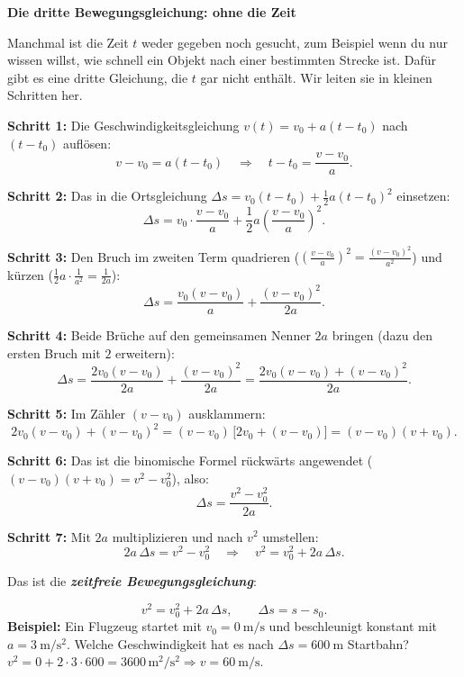 \documentclass[addpoints,11pt,a4paper]{exam}
\newenvironment{theoriebox}[1][Theorie]{%
  \par\addvspace{10pt}\noindent\textbf{#1}\par\smallskip\noindent
}{%
  \par\addvspace{10pt}
}
\begin{document}
\begin{theoriebox}[Die dritte Bewegungsgleichung: ohne die Zeit]
Manchmal ist die Zeit $t$ weder gegeben noch gesucht, zum Beispiel wenn
du nur wissen willst, wie schnell ein Objekt nach einer bestimmten
Strecke ist. Dafür gibt es eine dritte Gleichung, die $t$ gar nicht
enthält. Wir leiten sie in kleinen Schritten her.

\textbf{Schritt 1:} Die Geschwindigkeitsgleichung $v(t)=v_0+a(t-t_0)$
nach $(t-t_0)$ auflösen:
\[
  v - v_0 = a(t-t_0)
  \quad\Longrightarrow\quad
  t-t_0 = \frac{v-v_0}{a}.
\]

\textbf{Schritt 2:} Das in die Ortsgleichung
$\Delta s = v_0(t-t_0)+\frac{1}{2}a(t-t_0)^2$ einsetzen:
\[
  \Delta s = v_0\cdot\frac{v-v_0}{a} + \frac{1}{2}a\left(\frac{v-v_0}{a}\right)^2.
\]

\textbf{Schritt 3:} Den Bruch im zweiten Term quadrieren
($\left(\frac{v-v_0}{a}\right)^2 = \frac{(v-v_0)^2}{a^2}$) und kürzen
($\frac{1}{2}a\cdot\frac{1}{a^2}=\frac{1}{2a}$):
\[
  \Delta s = \frac{v_0(v-v_0)}{a} + \frac{(v-v_0)^2}{2a}.
\]

\textbf{Schritt 4:} Beide Brüche auf den gemeinsamen Nenner $2a$ bringen
(dazu den ersten Bruch mit $2$ erweitern):
\[
  \Delta s = \frac{2v_0(v-v_0)}{2a} + \frac{(v-v_0)^2}{2a}
  = \frac{2v_0(v-v_0) + (v-v_0)^2}{2a}.
\]

\textbf{Schritt 5:} Im Zähler $(v-v_0)$ ausklammern:
\[
  2v_0(v-v_0) + (v-v_0)^2 = (v-v_0)\,\big[2v_0 + (v-v_0)\big] = (v-v_0)(v+v_0).
\]

\textbf{Schritt 6:} Das ist die binomische Formel rückwärts angewendet
($(v-v_0)(v+v_0)=v^2-v_0^2$), also:
\[
  \Delta s = \frac{v^2-v_0^2}{2a}.
\]

\textbf{Schritt 7:} Mit $2a$ multiplizieren und nach $v^2$ umstellen:
\[
  2a\,\Delta s = v^2-v_0^2
  \quad\Longrightarrow\quad
  v^2 = v_0^2 + 2a\,\Delta s.
\]

Das ist die \textbf{\emph{zeitfreie Bewegungsgleichung}}:

\begin{formelbox}
\[
  \boxed{v^2 = v_0^2 + 2a\,\Delta s}, \qquad \Delta s = s-s_0.
\]
\textbf{Beispiel:} Ein Flugzeug startet mit $v_0=\SI{0}{\meter\per\second}$
und beschleunigt konstant mit $a=\SI{3}{\meter\per\second\squared}$.
Welche Geschwindigkeit hat es nach $\Delta s=\SI{600}{\meter}$
Startbahn? $v^2 = 0 + 2\cdot3\cdot600 = 3600\,\si{\meter\squared\per\second\squared}
\Rightarrow v=\SI{60}{\meter\per\second}$.
\end{formelbox}
\end{theoriebox}
\end{document}
